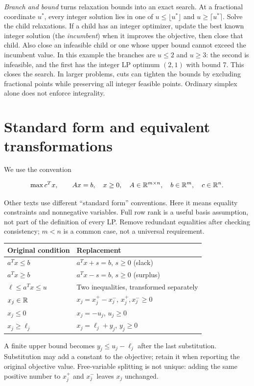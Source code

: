 \documentclass[11pt,a4paper]{article}
\begin{document}
\emph{Branch and bound} turns relaxation bounds into an exact search.
At a fractional coordinate $u^*$, every integer solution lies in one of
$u\leq\lfloor u^*\rfloor$ and $u\geq\lceil u^*\rceil$.
Solve the child relaxations. If a child has an integer optimizer, update the
best known integer solution (the \emph{incumbent}) when it improves the objective,
then close that child. Also close an infeasible child or one whose upper bound
cannot exceed the incumbent value. In this example the branches are $u\leq2$ and
$u\geq3$: the second is infeasible, and the first has the integer LP optimum
$(2,1)$ with bound 7. This closes the search. In larger problems, cuts can
tighten the bounds by excluding fractional points while preserving all integer
feasible points. Ordinary simplex alone does not enforce integrality.

\section{Standard form and equivalent transformations}\label{sec:standard}
We use the convention
\begin{lecturecore}
  \begin{equation}\label{eq:standard}
    \max c^Tx,\qquad Ax=b,\quad x\geq0,
    \quad A\in\mathbb{R}^{m\times n},\quad b\in\mathbb{R}^m,\quad c\in\mathbb{R}^n.
  \end{equation}
\end{lecturecore}
Other texts use different ``standard form'' conventions. Here it means equality
constraints and nonnegative variables. Full row rank is a useful basis assumption,
not part of the definition of every LP. Remove redundant equalities after checking
consistency; $m<n$ is a common case, not a universal requirement.

\begin{center}
  \begin{tabular}{ll}\toprule
    Original condition & Replacement\\\midrule
    $a^Tx\leq b$ & $a^Tx+s=b$, $s\geq0$ (slack)\\
    $a^Tx\geq b$ & $a^Tx-s=b$, $s\geq0$ (surplus)\\
    $\ell\leq a^Tx\leq u$ & Two inequalities, transformed separately\\
    $x_j\in\mathbb{R}$ & $x_j=x_j^+-x_j^-$, $x_j^+,x_j^-\geq0$\\
    $x_j\leq0$ & $x_j=-u_j$, $u_j\geq0$\\
    $x_j\geq\ell_j$ & $x_j=\ell_j+y_j$, $y_j\geq0$\\\bottomrule
  \end{tabular}
\end{center}
A finite upper bound becomes $y_j\leq u_j-\ell_j$ after the last substitution.
Substitution may add a constant to the objective; retain it when reporting the
original objective value. Free-variable splitting is not unique: adding the same
positive number to $x_j^+$ and $x_j^-$ leaves $x_j$ unchanged.
\end{document}
